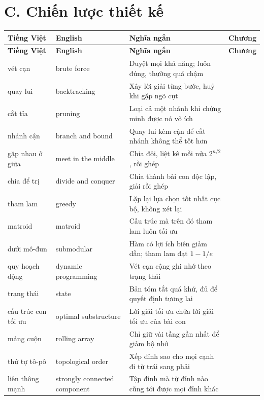 \documentclass[algorithm.tex]{subfiles}
\begin{document}
\section*{C. Chiến lược thiết kế}
\begin{center}\footnotesize
{}
\begin{longtable}{@{}L{3.5cm}L{3.9cm}L{6.2cm}L{1.5cm}@{}}
\toprule
\textbf{Tiếng Việt} & \textbf{English} & \textbf{Nghĩa ngắn} & \textbf{Chương}\\
\midrule
\endfirsthead
\toprule
\textbf{Tiếng Việt} & \textbf{English} & \textbf{Nghĩa ngắn} & \textbf{Chương}\\
\midrule
\endhead
vét cạn & brute force & Duyệt mọi khả năng; luôn đúng, thường quá chậm & \\
quay lui & backtracking & Xây lời giải từng bước, huỷ khi gặp ngõ cụt & \\
cắt tỉa & pruning & Loại cả một nhánh khi chứng minh được nó vô ích & \\
nhánh cận & branch and bound & Quay lui kèm cận để cắt nhánh không thể tốt hơn & \\
gặp nhau ở giữa & meet in the middle & Chia đôi, liệt kê mỗi nửa \(2^{n/2}\), rồi ghép & \\
chia để trị & divide and conquer & Chia thành bài con độc lập, giải rồi ghép & \\
tham lam & greedy & Lặp lại lựa chọn tốt nhất cục bộ, không xét lại & \\
matroid & matroid & Cấu trúc mà trên đó tham lam luôn tối ưu & \\
dưới mô-đun & submodular & Hàm có lợi ích biên giảm dần; tham lam đạt \(1-1/e\) & \\
quy hoạch động & dynamic programming & Vét cạn cộng ghi nhớ theo trạng thái & \\
trạng thái & state & Bản tóm tắt quá khứ, đủ để quyết định tương lai & \\
cấu trúc con tối ưu & optimal substructure & Lời giải tối ưu chứa lời giải tối ưu của bài con & \\
mảng cuộn & rolling array & Chỉ giữ vài tầng gần nhất để giảm bộ nhớ & \\
thứ tự tô-pô & topological order & Xếp đỉnh sao cho mọi cạnh đi từ trái sang phải & \\
liên thông mạnh & strongly connected component & Tập đỉnh mà từ đỉnh nào cũng tới được mọi đỉnh khác & \\

\end{longtable}
\end{center}
\end{document}
